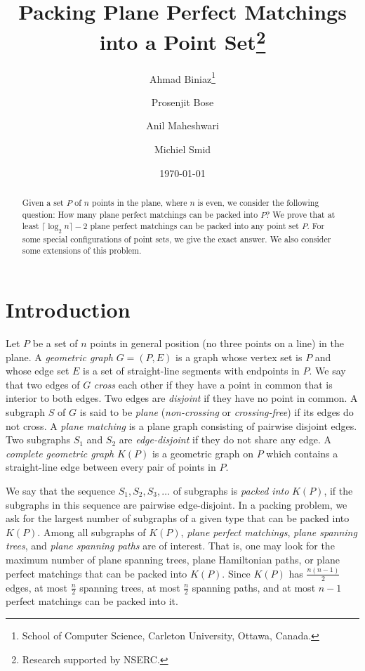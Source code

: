 \documentclass[11pt,a4paper]{article}
\title{Packing Plane Perfect Matchings into a Point Set\thanks{Research supported by NSERC.}}
\author{
Ahmad Biniaz\thanks{School of Computer Science, Carleton University, 
                    Ottawa, Canada.}
\and 
Prosenjit Bose\footnotemark[2]
\and
Anil Maheshwari\footnotemark[2]
\and 
Michiel Smid\footnotemark[2]
}\date{\today}
\newcommand{\Kn}[1]{K#1}
\begin{document}
\maketitle

\begin{abstract}
Given a set $P$ of $n$ points in the plane, where $n$ is even, we consider the following question: How many plane perfect matchings can be packed into $P$? We prove that at least $\lceil\log_2{n}\rceil-2$ plane perfect matchings can be packed into any point set $P$. For some special configurations of point sets, we give the exact answer. We also consider some extensions of this problem.
\end{abstract}
\section{Introduction}
\label{introduction-section}
Let $P$ be a set of $n$ points in general position (no three points on a line) in the plane. A {\em geometric graph} $G=(P,E)$ is a graph whose vertex set is $P$ and whose edge set $E$ is a set of straight-line segments with endpoints in $P$. We say that two edges of $G$ {\em cross} each other if they have a point in common that is interior to both edges. Two edges are {\em disjoint} if they have no point in common. A subgraph $S$ of $G$ is said to be {\em plane} ({\em non-crossing} or {\em crossing-free}) if its edges do not cross. A {\em plane matching} is a plane graph consisting of pairwise disjoint edges. Two subgraphs $S_1$ and $S_2$ are {\em edge-disjoint} if they do not share any edge. A {\em complete geometric graph} $\Kn{(P)}$ is a geometric graph on $P$ which contains a straight-line edge between every pair of points in $P$. 

We say that the sequence $S_1,S_2,S_3,\dots$ of subgraphs is {\em packed into} $\Kn{(P)}$, if the subgraphs in this sequence are pairwise edge-disjoint. In a packing problem, we ask for the largest number of subgraphs of a given type that can be packed into $\Kn{(P)}$. Among all subgraphs of $\Kn{(P)}$, {\em plane perfect matchings}, {\em plane spanning trees}, and {\em plane spanning paths} are of interest. That is, one may look for the maximum number of plane spanning trees, plane Hamiltonian paths, or plane perfect matchings that can be packed into $\Kn{(P)}$. Since $\Kn{(P)}$ has $\frac{n(n-1)}{2}$ edges, at most $\frac{n}{2}$ spanning trees, at most $\frac{n}{2}$ spanning paths, and at most $n-1$ perfect matchings can be packed into it. 
\end{document}
